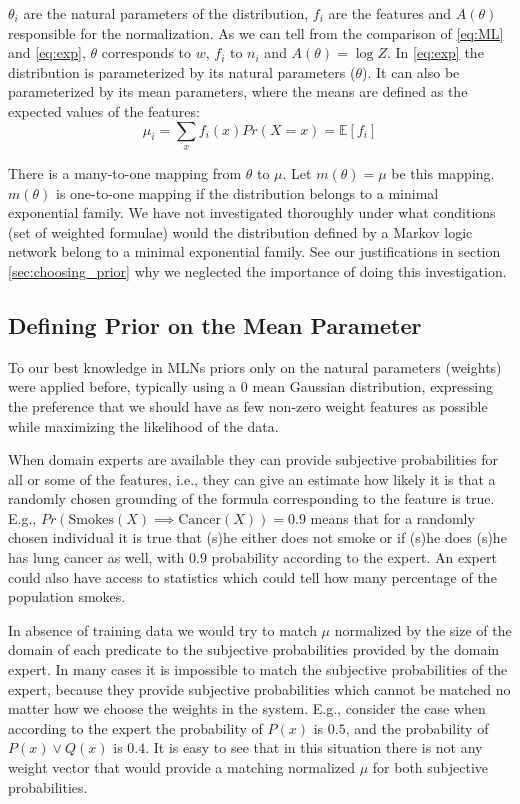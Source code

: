 \documentclass[12pt]{article}
\begin{document}
\noindent
$\theta_{i}$ are the natural parameters of the distribution, $f_i$ are the 
features and $A(\theta)$ responsible for the normalization. As we can tell from 
the comparison of \eqref{eq:ML} and \eqref{eq:exp}, $\theta$ corresponds 
to $w$, $f_{i}$ to $n_{i}$ and $A(\theta)=\log Z$. In \eqref{eq:exp} the
 distribution is parameterized by its natural parameters ($\theta$). It can 
also be parameterized by its mean parameters, where the means are defined 
as the expected values of the features:
\begin{equation}\label{eq:mean}
  \mu_{i}=\sum_{x} f_{i}(x) Pr(X=x)=\mathbb{E}\left[f_{i}\right]
\end{equation}

There is a many-to-one mapping from $\theta$ to $\mu$.
Let $m(\theta)=\mu$ be this mapping. $m(\theta)$ is one-to-one mapping 
if the distribution belongs to a minimal exponential family. We have not
investigated thoroughly under what conditions (set of weighted formulae)
would the distribution defined by a Markov logic network belong to a minimal
exponential family. See our justifications in section \ref{sec:choosing_prior} 
why we neglected the importance of doing this investigation.


\subsection{Defining Prior on the Mean Parameter}


To our best knowledge in MLNs priors only on the natural parameters (weights)
 were applied before, typically using a $0$ mean Gaussian distribution,
 expressing the preference that we should have as few non-zero weight 
features as possible while maximizing the likelihood of the data. 

When domain experts are available they can provide subjective 
probabilities for all or some of the features, i.e., they can give 
an estimate how likely it is that a randomly chosen grounding of the 
formula corresponding to the feature is true. E.g., 
$Pr \left(\mbox{Smokes}(X) \implies \mbox{Cancer}(X)\right)=0.9$ means that 
for a randomly chosen individual it is true that (s)he either does not smoke or 
if (s)he does (s)he has lung cancer as well, with $0.9$ probability 
according to the expert. An expert could also have access to statistics
which could tell how many percentage of the population smokes.

In absence of training data we would try to
match $\mu$ normalized by the size of the domain of each predicate to 
the subjective probabilities provided by the domain expert. In many cases
it is impossible to match the subjective probabilities of the expert, because
they provide subjective probabilities which cannot be matched no matter
how we choose the weights in the system. E.g., consider the case when
 according to the expert the probability of $P(x)$ is $0.5$, and 
the probability of $P(x) \lor Q(x)$ is $0.4$. It is easy to see that
in this situation there is not any weight vector that would provide a 
matching normalized $\mu$ for both subjective probabilities.
\end{document}
